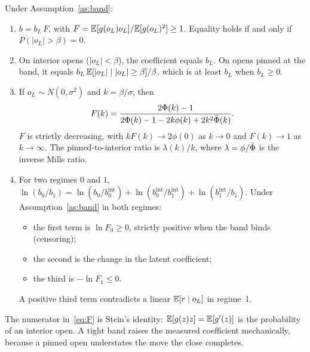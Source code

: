 \begin{proposition}\label{prop:band}
Under Assumption~\ref{as:band}:
\begin{enumerate}[label=(\alph*)]
  \item $b=b_L\,F$, with $F=\mathbb{E}[g(o_L)o_L]/\mathbb{E}[g(o_L)^2]\ge1$. Equality holds if and only if
        $P(|o_L|>\beta)=0$.
  \item On interior opens ($|o_L|<\beta$), the coefficient equals $b_L$. On opens pinned at the
        band, it equals $b_L\,\mathbb{E}[|o_L|\mid|o_L|\ge\beta]/\beta$, which is at least $b_L$ when
        $b_L\ge0$.
  \item If $o_L\sim N(0,\sigma^2)$ and $k=\beta/\sigma$, then
        \begin{equation}\label{eq:F}
          F(k)=\frac{2\Phi(k)-1}{2\Phi(k)-1-2k\phi(k)+2k^2\bar\Phi(k)}.
        \end{equation}
        $F$ is strictly decreasing, with $kF(k)\to2\phi(0)$ as $k\to0$ and $F(k)\to1$ as
        $k\to\infty$. The pinned-to-interior ratio is $\lambda(k)/k$, where
        $\lambda=\phi/\bar\Phi$ is the inverse Mills ratio.
  \item For two regimes $0$ and $1$,
        $\ln(b_0/b_1)=\ln(b_0/b_{0}^{\mathrm{int}})+\ln(b_{0}^{\mathrm{int}}/b_{1}^{\mathrm{int}})+\ln(b_{1}^{\mathrm{int}}/b_1)$.
        Under Assumption~\ref{as:band} in both regimes:
        \begin{itemize}
          \item the first term is $\ln F_0\ge0$, strictly positive when the band binds (censoring);
          \item the second is the change in the latent coefficient;
          \item the third is $-\ln F_1\le0$.
        \end{itemize}
        A positive third term contradicts a linear $\mathbb{E}[r\mid o_L]$ in regime~1.
\end{enumerate}
\end{proposition}

The numerator in~\eqref{eq:F} is Stein's identity: $\mathbb{E}[g(z)z]=\mathbb{E}[g'(z)]$ is the probability of
an interior open. A tight band raises the measured coefficient mechanically, because a pinned open
understates the move the close completes.

